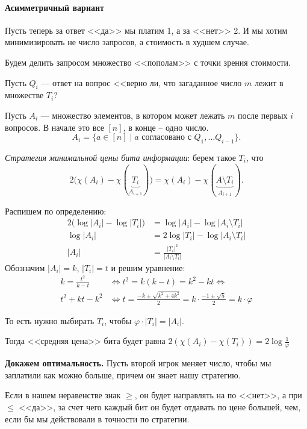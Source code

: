 \paragraph{Асимметричный вариант}
Пусть теперь за ответ <<да>> мы платим 1, а за <<нет>> 2. И мы хотим минимизировать не число запросов, а стоимость в худшем случае.

Будем делить запросом множество <<пополам>> с точки зрения стоимости.

Пусть $ Q_i $ --- ответ на вопрос <<верно ли, что загаданное число $ m$ лежит в множестве $ T_i$?

Пусть $ A_i$ --- множество элементов, в котором может лежать $ m$ после первых  $ i$ вопросов. В начале это все $ [n]$, в конце -- одно число.
\[
	A_i = \{a \in [n] \mid a \text{ согласовано с } Q_1, \ldots Q_{i-1}\}
.\] 

\textit{Стратегия минимальной цены бита информации}: берем такое $ T_i$, что
 \[
	 2\bigl(\chi(A_i) - \chi(\underbrace{T_i}_{A_{i+1}})\bigr) = \chi(A_i) - \chi(\underbrace{A \setminus T_i}_{A_{i+1}})
.\] 

Распишем по определению:
\begin{align*}
	2\bigl(\log \lvert A_i \rvert  - \log \lvert T_i \rvert \bigr) &= \log \lvert A_i \rvert - \log \lvert A_i \setminus T_i \rvert \\
	\log \lvert A_i \rvert &= 2 \log \lvert T_i \rvert - \log \lvert A_i \setminus T_i \rvert \\
	\lvert A_i \rvert  &= \frac{\lvert T_i \rvert^2 }{\lvert A_i \setminus T_i \rvert }
\end{align*}
Обозначим $ \lvert A_i \rvert = k$, $ \lvert T_i \rvert  = t$ и решим уравнение:
\begin{align*}
	k = \frac{t^2}{k-t} & \Longleftrightarrow t^2 = k(k-t) = k^2 -kt \Longleftrightarrow \\
	t^2 + kt - k^2 &\Longleftrightarrow t = \frac{-k \pm \sqrt{ k^2 + 4k^2} }{2} = k \cdot \frac{-1 \pm \sqrt{ 5}}{2}  = k \cdot \varphi 
\end{align*}

То есть нужно выбирать $ T_i$, чтобы $\varphi \cdot \lvert T_i \rvert = \lvert A_i \rvert$. 

Тогда <<средняя цена>> бита будет равна $ 2(\chi(A_i) - \chi(T_i)) = 2 \log \frac{1}{\varphi}$

\textbf{Докажем оптимальность.} Пусть второй игрок меняет число, чтобы мы заплатили как можно больше, причем он знает нашу стратегию.

Если в нашем неравенстве знак $ \ge $, он будет направлять на по <<нет>>, а при  $ \le$ <<да>>, за счет чего каждый бит он будет отдавать по цене большей, чем, если бы мы действовали в точности по стратегии. 

